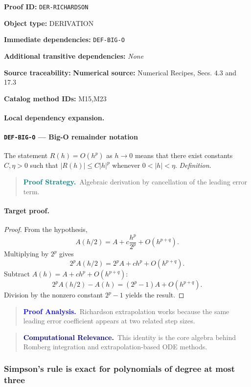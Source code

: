 \documentclass[10pt]{article}
\newcommand{\pidraw}[1]{\begingroup\urlstyle{tt}\nolinkurl{#1}\endgroup}
\theoremstyle{definition}
\theoremstyle{remark}
\newenvironment{proofstrategy}
{\begin{quote}\small\noindent\textbf{\textcolor{teal}{Proof Strategy.}}\ }
{\end{quote}}
\newenvironment{proofanalysis}
{\begin{quote}\small\noindent\textbf{\textcolor{blue}{Proof Analysis.}}\ }
{\end{quote}}
\newenvironment{computationalrelevance}
{\begin{quote}\small\noindent\textbf{\textcolor{navy}{Computational Relevance.}}\ }
{\end{quote}}
\newcommand{\meta}[2]{\noindent\textbf{#1:} #2\par}
\begin{document}
\meta{Proof ID}{\pidraw{DER-RICHARDSON}}
\meta{Object type}{DERIVATION}
\meta{Immediate dependencies}{\pidraw{DEF-BIG-O}}
\meta{Additional transitive dependencies}{\emph{None}}
\meta{Source traceability}{\textbf{Numerical source:} Numerical Recipes, Secs. 4.3 and 17.3}
\meta{Catalog method IDs}{M15,M23}

\paragraph{Local dependency expansion.}

\paragraph{\pidraw{DEF-BIG-O} --- Big-O remainder notation}
The statement $R(h)=O(h^p)$ as $h\to0$ means that there exist constants $C,\eta>0$ such that $|R(h)|\le C|h|^p$ whenever $0<|h|<\eta$.
\textit{Definition.}

\begin{proofstrategy}Algebraic derivation by cancellation of the leading error term.\end{proofstrategy}

\paragraph{Target proof.}

\begin{proof}

From the hypothesis,
\[
A(h/2)=A+c\frac{h^p}{2^p}+O(h^{p+q}).
\]
Multiplying by $2^p$ gives
\[
2^pA(h/2)=2^pA+c h^p+O(h^{p+q}).
\]
Subtract $A(h)=A+c h^p+O(h^{p+q})$:
\[
2^pA(h/2)-A(h)=(2^p-1)A+O(h^{p+q}).
\]
Division by the nonzero constant $2^p-1$ yields the result.

\end{proof}

\begin{proofanalysis}Richardson extrapolation works because the same leading error coefficient appears at two related step sizes.\end{proofanalysis}

\begin{computationalrelevance}This identity is the core algebra behind Romberg integration and extrapolation-based ODE methods.\end{computationalrelevance}

\subsubsection{Simpson's rule is exact for polynomials of degree at most three}
\end{document}
